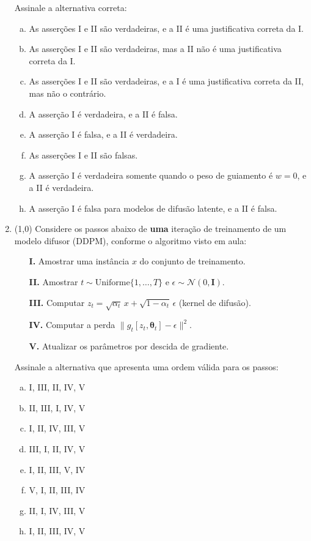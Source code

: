 \documentclass[11pt,a4paper]{article}
\newcommand{\thetav}{\boldsymbol{\theta}}
\begin{document}
\begin{enumerate}[1)]
Assinale a alternativa correta:
\begin{enumerate}[a)]
    \item As asserções I e II são verdadeiras, e a II é uma justificativa correta da I.
    \item As asserções I e II são verdadeiras, mas a II não é uma justificativa correta da I.
    \item As asserções I e II são verdadeiras, e a I é uma justificativa correta da II, mas não o contrário.
    \item A asserção I é verdadeira, e a II é falsa.
    \item A asserção I é falsa, e a II é verdadeira.
    \item As asserções I e II são falsas.
    \item A asserção I é verdadeira somente quando o peso de guiamento é $w = 0$, e a II é verdadeira.
    \item A asserção I é falsa para modelos de difusão latente, e a II é falsa.
\end{enumerate}

\item (1{,}0) Considere os passos abaixo de \textbf{uma} iteração de treinamento de um modelo difusor (DDPM), conforme o algoritmo visto em aula:

\begin{itemize}
    \item[\textbf{I.}] Amostrar uma instância $x$ do conjunto de treinamento.
    \item[\textbf{II.}] Amostrar $t \sim \mathrm{Uniforme}\{1, \dots, T\}$ e $\epsilon \sim \mathcal{N}(0, \mathbf{I})$.
    \item[\textbf{III.}] Computar $z_t = \sqrt{\alpha_t}\,x + \sqrt{1 - \alpha_t}\,\epsilon$ (kernel de difusão).
    \item[\textbf{IV.}] Computar a perda $\lVert g_t[z_t, \thetav_t] - \epsilon\rVert^{2}$.
    \item[\textbf{V.}] Atualizar os parâmetros por descida de gradiente.
\end{itemize}

Assinale a alternativa que apresenta uma ordem válida para os passos:
\begin{enumerate}[a)]
    \item I, III, II, IV, V
    \item II, III, I, IV, V
    \item I, II, IV, III, V
    \item III, I, II, IV, V
    \item I, II, III, V, IV
    \item V, I, II, III, IV
    \item II, I, IV, III, V
    \item I, II, III, IV, V
\end{enumerate}


\end{enumerate}
\end{document}
